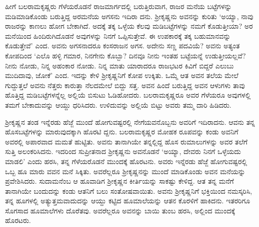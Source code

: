 ಹೀಗೆ ಬಲರಾಮಕೃಷ್ಣರು ಗೆಳೆಯರೊಡನೆ ರಾಜಮಾರ್ಗದಲ್ಲಿ ಬರುತ್ತಿರುವಾಗ, ರಾಜರ ಮನೆಯ ಬಟ್ಟೆಗಳನ್ನು ಮಡಿಮಾಡಿಕೊಂಡು ಬರುತ್ತಿದ್ದ ಅರಮನೆಯ ಅಗಸನು ಇದಿರಾ ದನು. ಶ್ರೀಕೃಷ್ಣನು ಅವನನ್ನು ಕುರಿತು ‘ಅಯ್ಯಾ, ನಾವು ರಾಜರನ್ನು ಕಾಣಲು ಹೋಗ ಬೇಕಾಗಿದೆ. ಅದಕ್ಕೆ ತಕ್ಕ ಒಳ್ಳೆಯ ಕೆಲವು ಮಡಿಬಟ್ಟೆಗಳನ್ನು ನಮಗೆ ಕೊಡುತ್ತೀಯಾ? ಅರ ಮನೆಯಿಂದ ಹಿಂದಿರುಗಿದೊಡನೆ ಅವುಗಳನ್ನು ನಿನಗೆ ಒಪ್ಪಿಸುತ್ತೇವೆ. ಈ ಉಪಕಾರಕ್ಕೆ ತಕ್ಕ ಬಹುಮಾನವನ್ನು ಕೊಡುತ್ತೇವೆ’ ಎಂದ. ಅವನು ಅಗಸನಾದರೂ ಕಂಸರಾಜನ ಅಗಸ. ಅದೇನು ಸಣ್ಣ ಪದವಿಯೆ? ಅವನು ಅತ್ಯಂತ ಕೋಪದಿಂದ ‘ಎಲೊ ಹಳ್ಳಿ ಗಮಾರ, ನಿನಗೇನು ಕೊಬ್ಬಾ? ದಿನವೂ ನೀನು ಇಂತಹ ಬಟ್ಟೆಯನ್ನೆ ಉಡುತ್ತೀಯಲ್ಲವೆ? ನೀನು ನೋಡು, ನಿನ್ನ ಅಹಂಕಾರ ನೋಡು. ನಿನ್ನ ಮಾತು ಯಾರಾದರೂ ರಾಜಭಟರ ಕಿವಿಗೆ ಬಿದ್ದರೆ ಎಲುಬು ಮುದಿದಾವು, ಜೋಕೆ’ ಎಂದ. ಇದನ್ನು ಕೇಳಿ ಶ್ರೀಕೃಷ್ಣನಿಗೆ ಕೋಪ ಉಕ್ಕಿತು. ಒಮ್ಮೆ ಆತ ಅವನ ತಲೆಯ ಮೇಲೆ ಗುದ್ದುತ್ತಲೆ ಅವನು ನೆತ್ತರು ಕಾರುತ್ತಾ ನೆಲದಮೇಲೆ ಬಿದ್ದು ಸತ್ತ. ಅವನ ಹಿಂದೆ ಬರುತ್ತಿದ್ದ ಅವನ ಆಳುಗಳು ತಾವು ಹೊತ್ತಿದ್ದ ಮಡಿಬಟ್ಟೆಗಳನ್ನೆಲ್ಲ ಅಲ್ಲಿಯೆ ಬಿಸುಟು ಓಡಿಹೋದರು. ಬಲರಾಮಕೃಷ್ಣರೂ ಅವರ ಗೆಳೆಯರೂ ಅವುಗಳಲ್ಲಿ ತಮಗೆ ಬೇಕಾದುವನ್ನು ಆಯ್ದು ಧರಿಸಿದರು. ಉಳಿದುವನ್ನು ಅಲ್ಲಿಯೆ ಬಿಟ್ಟು ಅವರು ತಮ್ಮ ದಾರಿ ಹಿಡಿದರು.

ಶ್ರೀಕೃಷ್ಣನ ತಂಡ ಇನ್ನೆರಡು ಹೆಜ್ಜೆ ಮುಂದೆ ಹೋಗುವಷ್ಟರಲ್ಲಿ ನೇಗೆಯವನೊಬ್ಬನು ಅವರಿಗೆ ಇದಿರಾದನು. ಆವನು ತನ್ನ ಹೊಸಬಟ್ಟೆಗಳನ್ನು ಮಾರುವುದಕ್ಕಾಗಿ ಹೊರಟಿ ದ್ದನು. ಬಲರಾಮಕೃಷ್ಣರ ಮೋಹಕ ರೂಪವನ್ನು ಕಂಡು ಅವನಿಗೆ ಅವರಲ್ಲಿ ಅಪಾರವಾದ ಮಮತೆ ಹುಟ್ಟಿತು. ಅವನು ತಾನಾಗಿಯೇ ತನ್ನಲ್ಲಿದ್ದ ಹೊಸ ರುಮಾಲುಗಳನ್ನು ಅವರ ತಲೆಗೆ ಸುತ್ತಿ ಅಲಂಕರಿಸಿದನು. ಇದರಿಂದ ಸುಪ್ರೀತನಾದ ಶ್ರೀಕೃಷ್ಣನು ಅವನೊಡನೆ ‘ಅಯ್ಯಾ, ದೇವರು ನಿನಗೆ ಒಳ್ಳೆಯದು ಮಾಡಲಿ’ ಎಂದು ಹರಸಿ, ತನ್ನ ಗೆಳೆಯರೊಡನೆ ಮುಂದಕ್ಕೆ ಹೊರಟನು. ಅವರು ಇನ್ನೆರಡು ಹೆಜ್ಜೆ ಹೋಗುವಷ್ಟರಲ್ಲಿ ಒಬ್ಬ ಹೂ ಮಾರು ವವನ ಮನೆ ಸಿಕ್ಕಿತು. ಅವರೆಲ್ಲರೂ ಶ್ರೀಕೃಷ್ಣನನ್ನು ಮುಂದೆ ಮಾಡಿಕೊಂಡು ಅವನ ಮನೆಯನ್ನು ಪ್ರವೇಶಿಸಿದರು. ಸುದಾಮನೆಂಬ ಆ ಹೂವಾಡಿಗ ಶ್ರೀಕೃಷ್ಣನ ಕೀರ್ತಿಯನ್ನು ಸಾಕಷ್ಟು ಕೇಳಿದ್ದ. ಆತ ತನ್ನ ಮನೆಗೆ ತಾನಾಗಿಯೇ ಬಂದುದನ್ನು ಕಂಡು ಆತನಿಗೆ ಬಲು ಸಂತೋಷವಾಯಿತು. ಅವನು ಶ್ರೀಕೃಷ್ಣನಿಗೆ ಭಕ್ತಿಯಿಂದ ನಮಸ್ಕರಿಸಿ, ತನ್ನ ಹೂಗಳಲ್ಲಿ ಅತ್ಯುತ್ತಮವಾದುದನ್ನು ಆಯ್ದು ಕಟ್ಟಿದ ಹೂಮಾಲೆಯನ್ನು ಆತನ ಕೊರಳಿಗೆ ಹಾಕಿದನು. ಇತರರಿಗೂ ಸೊಗಸಾದ ಹೂಮಾಲೆಗಳು ದೊರೆತವು. ಅವರೆಲ್ಲರೂ ಅವನನ್ನು ಬಾಯಿ ತುಂಬ ಹರಸಿ, ಅಲ್ಲಿಂದ ಮುಂದಕ್ಕೆ ಹೊರಟರು.


